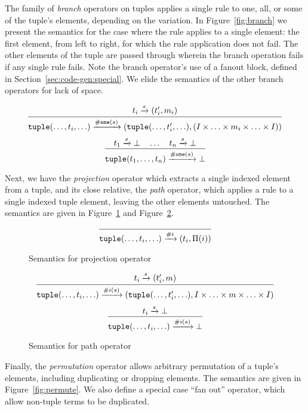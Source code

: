 The family of \emph{branch} operators on tuples applies a single rule to one, all, or some of the tuple's elements, depending on the variation. In Figure~\ref{fig:branch} we present the semantics for the case where the rule applies to a single element: the first element, from left to right, for which the rule application does not fail. The other elements of the tuple are passed through wherein the branch operation fails if any single rule fails. Note the branch operator's use of a fanout block, defined in Section~\ref{sec:code-gen:special}. We elide the semantics of the other branch operators for lack of space.

\begin{figure*}[ht]
\label{fig:branch}
\[
\infer
  {\mathtt{tuple}(\ldots,t_i,\ldots) \arr{\mathtt{\#one}(s)} (\mathtt{tuple}(\ldots,t_i',\ldots),(I \times \ldots \times m_i \times \ldots \times I))}
  {t_i \arr{s} (t_i',m_i)}
\]
\[
\infer
  {\mathtt{tuple}(t_1,\ldots,t_n) \arr{\mathtt{\#one}(s)} \bot}
  {t_1 \arr{s} \bot \quad \ldots \quad t_n \arr{s} \bot}
\]
\caption{Semantics for branch-one operator}
\end{figure*}

Next, we have the \emph{projection} operator which extracts a single indexed element from a tuple, and its close relative, the \emph{path} operator, which applies a rule to a single indexed tuple element, leaving the other elements untouched. The semantics are given in Figure~\ref{fig:projection} and Figure~\ref{fig:path}.

\begin{figure}[ht]
\label{fig:projection}
\[
\infer
  {\mathtt{tuple}(\ldots,t_i,\ldots) \arr{\#i} (t_i,\Pi(i))}
  {}
\]
\caption{Semantics for projection operator}
\end{figure}

\begin{figure}[ht]
\label{fig:path}
\[
\infer
  {\mathtt{tuple}(\ldots,t_i,\ldots) \arr{\#i(s)} (\mathtt{tuple}(\ldots,t_i',\ldots), I \times \ldots \times m \times \ldots \times I)}
  {t_i \arr{s} (t_i',m)}
\]
\[
\infer
  {\mathtt{tuple}(\ldots,t_i,\ldots) \arr{\#i(s)} \bot}
  {t_i \arr{s} \bot}
\]
\caption{Semantics for path operator}
\end{figure}

Finally, the \emph{permutation} operator allows arbitrary permutation of a tuple's elements, including duplicating or dropping elements. The semantics are given in Figure~\ref{fig:permute}. We also define a special case ``fan out'' operator, which allow non-tuple terms to be duplicated.

